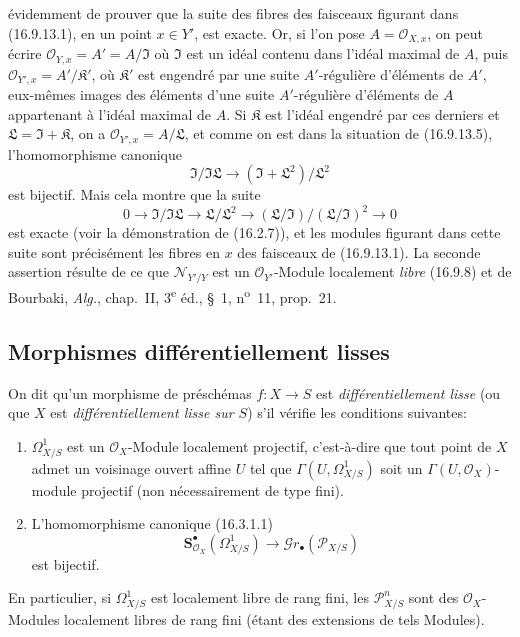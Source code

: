 évidemment de prouver que la suite des fibres des faisceaux figurant dans
(16.9.13.1), en un point $x\in Y'$, est exacte. Or, si l'on pose
$A=\mathcal{O}_{X,x}$, on peut écrire
$\mathcal{O}_{Y,x}=A'=A/\mathfrak{I}$ où $\mathfrak{I}$ est un idéal contenu
dans l'idéal maximal de $A$, puis
$\mathcal{O}_{Y',x}=A'/\mathfrak{K}'$, où $\mathfrak{K}'$ est engendré par une
suite $A'$-régulière d'éléments de $A'$, eux-mêmes images des éléments d'une
suite $A'$-régulière d'éléments de $A$ appartenant à l'idéal maximal de $A$.
Si $\mathfrak{K}$ est l'idéal engendré par ces derniers et
$\mathfrak{L}=\mathfrak{I}+\mathfrak{K}$, on a
$\mathcal{O}_{Y',x}=A/\mathfrak{L}$, et comme on est dans la situation de
(16.9.13.5), l'homomorphisme canonique
\[
  \mathfrak{I}/\mathfrak{I}\mathfrak{L}
  \longrightarrow(\mathfrak{I}+\mathfrak{L}^2)/\mathfrak{L}^2
\]
est bijectif. Mais cela montre que la suite
\[
  0\longrightarrow\mathfrak{I}/\mathfrak{I}\mathfrak{L}
  \longrightarrow\mathfrak{L}/\mathfrak{L}^2
  \longrightarrow(\mathfrak{L}/\mathfrak{I})/
    (\mathfrak{L}/\mathfrak{I})^2\longrightarrow0
\]
est exacte (voir la démonstration de (16.2.7)), et les modules figurant dans
cette suite sont précisément les fibres en $x$ des faisceaux de (16.9.13.1).
La seconde assertion résulte de ce que $\mathcal{N}_{Y'/Y}$ est un
$\mathcal{O}_{Y'}$-Module localement \emph{libre} (16.9.8) et de Bourbaki,
\emph{Alg.}, chap.~II, 3\textsuperscript{e} éd., §~1, n\textsuperscript{o}~11,
prop.~21.

\subsection{Morphismes différentiellement lisses}

\begin{definition}[16.10.1]
On dit qu'un morphisme de préschémas $f:X\to S$ est
\emph{différentiellement lisse} (ou que $X$ est \emph{différentiellement
lisse sur $S$}) s'il vérifie les conditions suivantes:
\begin{enumerate}
  \item[(i)] $\Omega_{X/S}^1$ est un $\mathcal{O}_X$-Module localement
  projectif, c'est-à-dire que tout point de $X$ admet un voisinage ouvert
  affine $U$ tel que $\Gamma(U,\Omega_{X/S}^1)$ soit un
  $\Gamma(U,\mathcal{O}_X)$-module projectif (non nécessairement de type
  fini).
  \item[(ii)] L'homomorphisme canonique (16.3.1.1)
  \[
    \mathbf{S}_{\mathcal{O}_X}^{\bullet}(\Omega_{X/S}^1)
    \longrightarrow\mathscr{G}r_{\bullet}(\mathscr{P}_{X/S})
  \]
  est bijectif.
\end{enumerate}
En particulier, si $\Omega_{X/S}^1$ est localement libre de rang fini, les
$\mathscr{P}_{X/S}^n$ sont des $\mathcal{O}_X$-Modules localement libres de
rang fini (étant des extensions de tels Modules).
\end{definition}

